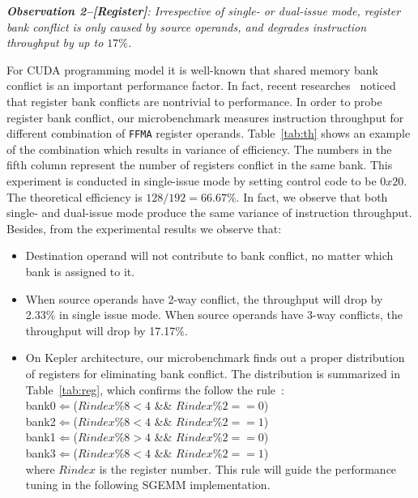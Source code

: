 \documentclass{sig-alternate-05-2015}
\begin{document}
{\em {\bf Observation 2--[Register]}: Irrespective of single- or dual-issue mode, register bank conflict is only caused by source operands, and degrades instruction throughput by up to $17\%$.}

For CUDA programming model it is well-known that shared memory bank conflict is an important performance factor. In fact, recent researches~\cite{} noticed that register bank conflicts are nontrivial to performance.  In order to probe register bank conflict, our microbenchmark measures instruction throughput for different combination of {\tt FFMA} register operands. Table~\ref{tab:th} shows an example of the combination which results in variance of efficiency. The numbers in the fifth column represent the number of registers conflict in the same bank. This experiment is conducted in single-issue mode by setting control code to be $0x20$. The theoretical efficiency is $128/192=66.67\%$. In fact, we observe that both single- and dual-issue mode produce the same variance of instruction throughput. Besides, from the experimental results we observe that:
\begin{itemize}
\item Destination operand will not contribute to bank conflict, no matter which bank is assigned to it.
\item When source operands have 2-way conflict, the throughput will drop by 2.33\% in single issue
    mode. When source operands have 3-way conflicts, the throughput will drop by 17.17\%.

 \item On Kepler architecture, our microbenchmark finds out a proper distribution of registers for eliminating bank conflict. The distribution is summarized in Table~\ref{tab:reg}, which confirms the follow the rule~\cite{}: \\
 bank0$\Leftarrow$($Rindex \% 8 < 4$ \&\& $Rindex \% 2 == 0$) \\
 bank2$\Leftarrow$($Rindex \% 8 < 4$ \&\&
$Rindex \% 2 == 1$) \\
bank1$\Leftarrow$($Rindex \% 8 > 4$ \&\& $Rindex \%2 == 0$) \\
bank3$\Leftarrow$($Rindex \% 8 < 4$ \&\&
$Rindex\% 2 == 1$)\\
where $Rindex$ is the register number. This rule will guide the performance tuning in the following SGEMM implementation.

\end{itemize}
\end{document}
